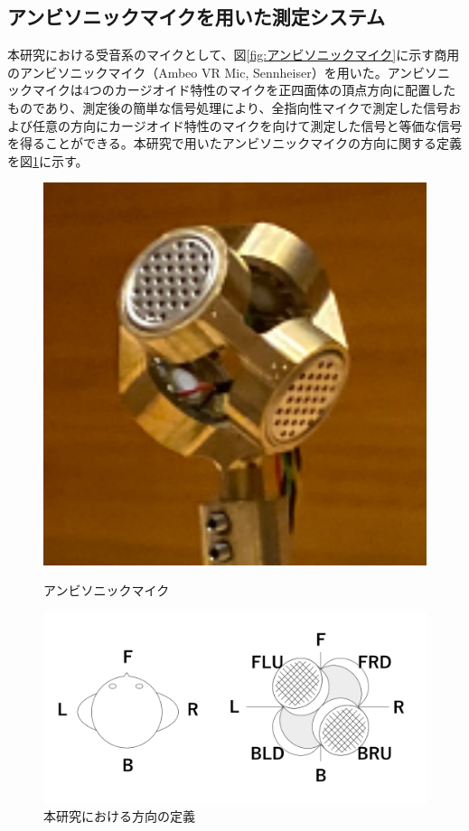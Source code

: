\documentclass[11pt,a4j]{jreport}
\begin{document}
\newpage
\subsection*{アンビソニックマイクを用いた測定システム}
本研究における受音系のマイクとして、図\ref{fig:アンビソニックマイク}に示す商用のアンビソニックマイク（Ambeo VR Mic, Sennheiser）を用いた。アンビソニックマイクは4つのカージオイド特性のマイクを正四面体の頂点方向に配置したものであり、測定後の簡単な信号処理により、全指向性マイクで測定した信号および任意の方向にカージオイド特性のマイクを向けて測定した信号と等価な信号を得ることができる\cite{西村竜一2014}。本研究で用いたアンビソニックマイクの方向に関する定義を図\ref{fig:方向の定義}に示す。

\begin{figure}[H]
  \begin{minipage}[b]{.33\textwidth}
      \centering
      \includegraphics[width=.8\linewidth]{images/ambisonicMic.png}
      \caption{アンビソニックマイク}
      \label{fig:アンビソニックマイク}
  \end{minipage}%
  \begin{minipage}[b]{.66\textwidth}
      \centering
      \includegraphics[width=.8\linewidth]{images/ambisonicMicDirectionDef.png}
      \caption{本研究における方向の定義}
      \label{fig:方向の定義}
  \end{minipage}
\end{figure}
\end{document}
